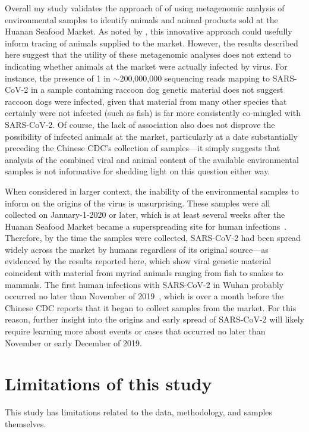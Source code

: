 \documentclass[9pt,twocolumn,twoside]{gsajnl_modified}
\begin{document}
Overall my study validates the approach of \citet{crits2023genetic} of using metagenomic analysis of environmental samples to identify animals and animal products sold at the Huanan Seafood Market.
As noted by \citet{crits2023genetic}, this innovative approach could usefully inform tracing of animals supplied to the market.
However, the results described here suggest that the utility of these metagenomic analyses does not extend to indicating whether animals at the market were actually infected by virus.
For instance, the presence of 1 in $\sim$200,000,000 sequencing reads mapping to SARS-CoV-2 in a sample containing raccoon dog genetic material does not suggest raccoon dogs were infected, given that material from many other species that certainly were not infected (such as fish) is far more consistently co-mingled with SARS-CoV-2.
Of course, the lack of association also does not disprove the possibility of infected animals at the market, particularly at a date substantially preceding the Chinese CDC's collection of samples---it simply suggests that analysis of the combined viral and animal content of the available environmental samples is not informative for shedding light on this question either way.

When considered in larger context, the inability of the environmental samples to inform on the origins of the virus is unsurprising.
These samples were all collected on January-1-2020 or later, which is at least several weeks after the Huanan Seafood Market became a superspreading site for human infections~\citep{li2020early}.
Therefore, by the time the samples were collected, SARS-CoV-2 had been spread widely across the market by humans regardless of its original source---as evidenced by the results reported here, which show viral genetic material coincident with material from myriad animals ranging from fish to snakes to mammals. 
The first human infections with SARS-CoV-2 in Wuhan probably occurred no later than November of 2019~\citep{zhang2020viral,van2020emergence,he2020evaluating,pipes2021assessing,pekar2021timing,odni2022,pekar2022molecular}, which is over a month before the Chinese CDC reports that it began to collect samples from the market.
For this reason, further insight into the origins and early spread of SARS-CoV-2 will likely require learning more about events or cases that occurred no later than November or early December of 2019. 


\section{Limitations of this study}
This study has limitations related to the data, methodology, and samples themselves.
\end{document}

